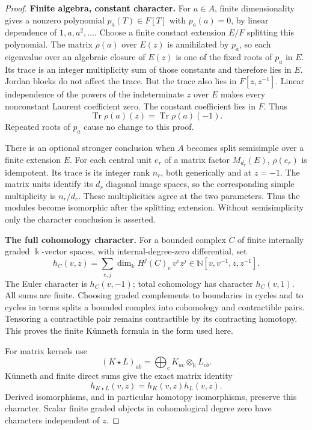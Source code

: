 \documentclass[11pt,a4paper]{article}
\theoremstyle{named}\newtheorem{finding}{Finding}[section]
\theoremstyle{definition}\newtheorem{definition}[finding]{Definition}
\theoremstyle{remark}\newtheorem{remark}[finding]{Remark}
\begin{document}
\begin{proof}
\par\smallskip\noindent\textbf{Finite algebra, constant character.}\quad
For \(a\in A\), finite dimensionality gives a nonzero polynomial
\(p_a(T)\in F[T]\) with \(p_a(a)=0\), by linear dependence of
\(1,a,a^2,\ldots\).
Choose a finite constant extension \(E/F\) splitting this polynomial.
The matrix \(\rho(a)\) over \(E(z)\) is annihilated by \(p_a\),
so each eigenvalue over an algebraic closure of \(E(z)\) is one of
the fixed roots of \(p_a\) in \(E\).
Its trace is an integer multiplicity sum of those constants and
therefore lies in \(E\). Jordan blocks do not affect the trace.
But the trace also lies in \(F[z,z^{-1}]\).
Linear independence of the powers of the indeterminate \(z\)
over \(E\) makes every nonconstant Laurent coefficient zero.
The constant coefficient lies in \(F\). Thus
\begin{equation}\label{eq:finitealgebracharconstant}
\operatorname{Tr}\rho(a)(z)=\operatorname{Tr}\rho(a)(-1).
\end{equation}
Repeated roots of \(p_a\) cause no change to this proof.

There is an optional stronger conclusion when \(A\) becomes
split semisimple over a finite extension \(E\).
For each central unit \(e_r\) of a matrix factor \(M_{d_r}(E)\),
\(\rho(e_r)\) is idempotent. Its trace is its integer rank
\(n_r\), both generically and at \(z=-1\).
The matrix units identify its \(d_r\) diagonal image spaces,
so the corresponding simple multiplicity is \(n_r/d_r\).
These multiplicities agree at the two parameters.
Thus the modules become isomorphic after the splitting extension.
Without semisimplicity only the character conclusion is asserted.

\par\smallskip\noindent\textbf{The full cohomology character.}\quad
For a bounded complex \(C\) of finite internally graded
\(\Bbbk\)-vector spaces, with internal-degree-zero differential, set
\[
h_C(v,z)=\sum_{e,j}\dim_{\Bbbk}H^j(C)_e\,v^ez^j
\in\mathbb N[v,v^{-1},z,z^{-1}].
\]
The Euler character is \(h_C(v,-1)\); total cohomology has
character \(h_C(v,1)\).
All sums are finite.
Choosing graded complements to boundaries in cycles and to
cycles in terms splits a bounded complex into cohomology and
contractible pairs. Tensoring a contractible pair remains
contractible by its contracting homotopy. This proves the finite
K\"unneth formula in the form used here.

For matrix kernels use
\[
(K\star L)_{ab}=\bigoplus_c K_{ac}\otimes_{\Bbbk}L_{cb}.
\]
K\"unneth and finite direct sums give the exact matrix identity
\begin{equation}\label{eq:kernelPoincareproduct}
h_{K\star L}(v,z)=h_K(v,z)h_L(v,z).
\end{equation}
Derived isomorphisms, and in particular homotopy isomorphisms,
preserve this character.
Scalar finite graded objects in cohomological degree zero
have characters independent of \(z\).


\end{proof}
\end{document}
